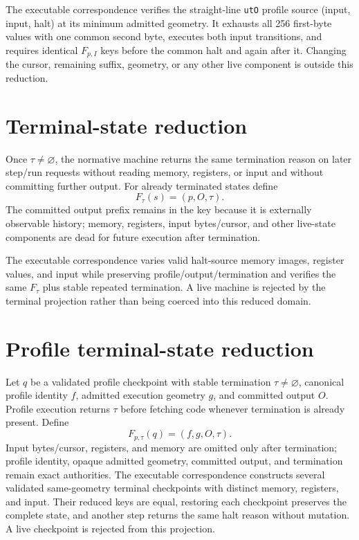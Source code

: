 \documentclass{article}
\begin{document}
The executable correspondence verifies the straight-line \texttt{utO} profile
source (input, input, halt) at its minimum admitted geometry. It exhausts all
256
first-byte values with one common second byte, executes both input transitions,
and requires identical $F_{p,I}$ keys before the common halt and again after it.
Changing the cursor, remaining suffix, geometry, or any other live component is
outside this reduction.

\section{Terminal-state reduction}

Once $\tau\neq\varnothing$, the normative machine returns the same termination
reason on later step/run requests without reading memory, registers, or input
and
without committing further output. For already terminated states define
\begin{equation}
  F_{\tau}(s)=\left(p,O,\tau\right).
  \label{eq:state-graph-terminal-state}
\end{equation}
The committed output prefix remains in the key because it is externally
observable history; memory, registers, input bytes/cursor, and other live-state
components are dead for future execution after termination.

The executable correspondence varies valid halt-source memory images, register
values, and input while preserving profile/output/termination and verifies the
same $F_{\tau}$ plus stable repeated termination. A live machine is rejected by
the terminal projection rather than being coerced into this reduced domain.

\section{Profile terminal-state reduction}

Let $q$ be a validated profile checkpoint with stable termination
$\tau\neq\varnothing$, canonical profile identity $f$, admitted execution
geometry $g$, and committed output $O$. Profile execution returns $\tau$ before
fetching code whenever termination is already present. Define
\begin{equation}
  F_{p,\tau}(q)=\left(f,g,O,\tau\right).
  \label{eq:state-graph-profile-terminal-state}
\end{equation}
Input bytes/cursor, registers, and memory are omitted only after termination;
profile identity, opaque admitted geometry, committed output, and termination
remain exact authorities. The executable correspondence constructs several
validated same-geometry terminal checkpoints with distinct memory, registers,
and input. Their reduced keys are equal, restoring each checkpoint preserves the
complete state, and another step returns the same halt reason without mutation.
A live checkpoint is rejected from this projection.
\end{document}
